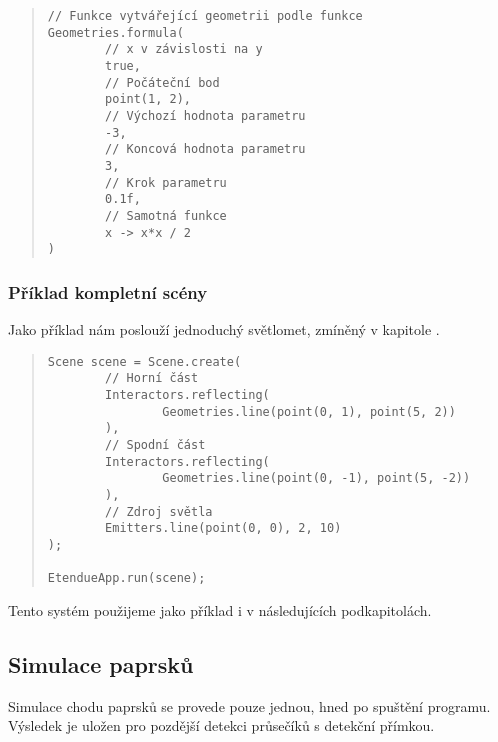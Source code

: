 \begin{minipage}{\textwidth}\begin{quote}\begin{lstlisting}
// Funkce vytvářející geometrii podle funkce
Geometries.formula(
        // x v závislosti na y
        true,
        // Počáteční bod
        point(1, 2),
        // Výchozí hodnota parametru
        -3,
        // Koncová hodnota parametru
        3,
        // Krok parametru
        0.1f,
        // Samotná funkce
        x -> x*x / 2
)
\end{lstlisting}\end{quote}\end{minipage}


\subsubsection{Příklad kompletní scény}

Jako příklad nám poslouží jednoduchý světlomet, zmíněný v kapitole .

\begin{minipage}{\textwidth}\begin{quote}\begin{lstlisting}
Scene scene = Scene.create(
        // Horní část
        Interactors.reflecting(
                Geometries.line(point(0, 1), point(5, 2))
        ),
        // Spodní část
        Interactors.reflecting(
                Geometries.line(point(0, -1), point(5, -2))
        ),
        // Zdroj světla
        Emitters.line(point(0, 0), 2, 10)
);

EtendueApp.run(scene);
\end{lstlisting}\end{quote}\end{minipage}

Tento systém použijeme jako příklad i v následujících podkapitolách.


\subsection{Simulace paprsků}
\label{sub:architekturaaplikace_simulacepaprsku}

Simulace chodu paprsků se provede pouze jednou, hned po spuštění programu. Výsledek je uložen pro pozdější detekci průsečíků s detekční přímkou.

